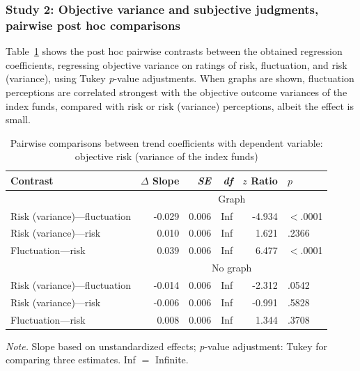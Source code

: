 \subsubsection{Study 2: Objective variance and subjective judgments, pairwise post hoc comparisons}
Table~\ref{tab:study2_hlm_trends_pairwise} shows the post hoc pairwise contrasts between the obtained regression coefficients, regressing objective variance on ratings of risk, fluctuation, and risk (variance), using Tukey \textit{p}-value adjustments. When graphs are shown, fluctuation perceptions are correlated strongest with the objective outcome variances of the index funds, compared with risk or risk (variance) perceptions, albeit the effect is small.
\begin{table}[H]
\centering
\caption{Pairwise comparisons between trend coefficients with dependent variable: objective risk (variance of the index funds)} 
\label{tab:study2_hlm_trends_pairwise}
\begin{threeparttable}

    
    \begin{tabular}{lrrrrl}
      \toprule
    Contrast & $\Delta$ Slope & \textit{SE} & \textit{df} & $z$ Ratio & $p$ \\ 
      \midrule
      & \multicolumn{5}{c}{Graph}\\
      \cmidrule{2-6}
    Risk (variance)---fluctuation & -0.029 & 0.006 & Inf & -4.934 & $<$.0001 \\ 
      Risk (variance)---risk & 0.010 & 0.006 & Inf & 1.621 & .2366 \\ 
      Fluctuation---risk & 0.039 & 0.006 & Inf & 6.477 & $<$.0001 \\ 
       \midrule
       & \multicolumn{5}{c}{No graph}\\
       \cmidrule{2-6}
    Risk (variance)---fluctuation & -0.014 & 0.006 & Inf & -2.312 & .0542 \\ 
      Risk (variance)---risk & -0.006 & 0.006 & Inf & -0.991 & .5828 \\ 
      Fluctuation---risk & 0.008 & 0.006 & Inf & 1.344 & .3708 \\ 
       \bottomrule
    \end{tabular}
    \begin{tablenotes}
    \textit{Note.} Slope based on unstandardized effects; \textit{p}-value adjustment: Tukey for comparing three estimates. Inf $=$ Infinite.
    \end{tablenotes}
    \end{threeparttable}
\end{table}


